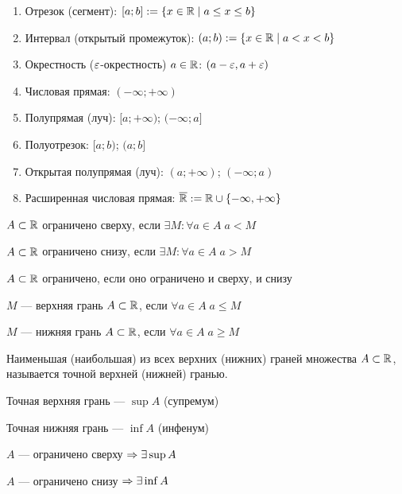 \documentclass{article}
\begin{document}

\begin{enumerate}
	\item Отрезок (сегмент): $[a;b] := \{x\in\mathbb{R}\;|\;a\leq x\leq b\}$
	\item Интервал (открытый промежуток): $(a;b) := \{x\in\mathbb{R}\;|\;a<x<b\}$
	\item Окрестность ($\varepsilon$-окрестность) $a\in\mathbb{R}$:
	      $(a-\varepsilon,a+\varepsilon)$
	\item Числовая прямая: $(-\infty;+\infty)$
	\item Полупрямая (луч): $[a;+\infty)$; $(-\infty;a]$
	\item Полуотрезок: $[a;b)$; $(a;b]$
	\item Открытая полупрямая (луч): $(a;+\infty)$; $(-\infty;a)$
	\item Расширенная числовая прямая: $\overline{\mathbb{R}}:=\mathbb{R}\cup\{-\infty,+\infty\}$
\end{enumerate}


$A\subset\mathbb{R}$ ограничено сверху, если $\exists M:\forall a\in A\;a<M$

$A\subset\mathbb{R}$ ограничено снизу, если $\exists M:\forall a\in A\;a>M$

$A\subset\mathbb{R}$ ограничено, если оно ограничено и сверху, и снизу


$M$ --- верхняя грань $A\subset\mathbb{R}$, если $\forall a\in A\;a\leq M$

$M$ --- нижняя грань $A\subset\mathbb{R}$, если $\forall a\in A\;a\geq M$

Наименьшая (наибольшая) из всех верхних (нижних) граней множества $A\subset\mathbb{R}$,
называется точной верхней (нижней) гранью.

Точная верхняя грань --- $\sup A$ (супремум)

Точная нижняя грань --- $\inf A$ (инфенум)

\pagebreak

\theorem

$A$ --- ограничено сверху $\Rightarrow \exists \sup A$

$A$ --- ограничено снизу $\Rightarrow \exists \inf A$
\end{document}
